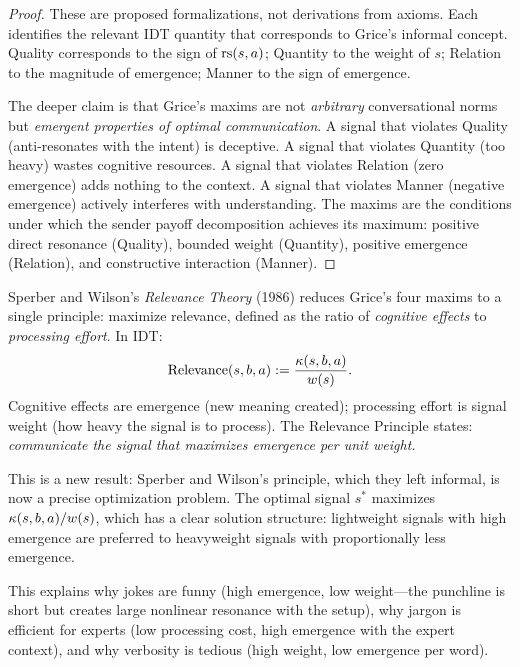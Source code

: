 \begin{proof}
These are proposed formalizations, not derivations from axioms. Each identifies
the relevant IDT quantity that corresponds to Grice's informal concept.
Quality corresponds to the sign of $\mathrm{rs}(s,a)$; Quantity to the weight of $s$;
Relation to the magnitude of emergence; Manner to the sign of emergence.

The deeper claim is that Grice's maxims are not \emph{arbitrary} conversational
norms but \emph{emergent properties of optimal communication}. A signal that
violates Quality (anti-resonates with the intent) is deceptive. A signal
that violates Quantity (too heavy) wastes cognitive resources. A signal
that violates Relation (zero emergence) adds nothing to the context.
A signal that violates Manner (negative emergence) actively interferes
with understanding. The maxims are the conditions under which the
sender payoff decomposition achieves its maximum: positive direct
resonance (Quality), bounded weight (Quantity), positive emergence
(Relation), and constructive interaction (Manner).
\end{proof}

\begin{interpretation}
Sperber and Wilson's \emph{Relevance Theory} (1986) reduces Grice's
four maxims to a single principle: maximize relevance, defined as the
ratio of \emph{cognitive effects} to \emph{processing effort}. In IDT:
\[
\text{Relevance}(s, b, a) := \frac{\kappa(s, b, a)}{w(s)}.
\]
Cognitive effects are emergence (new meaning created); processing effort
is signal weight (how heavy the signal is to process). The Relevance
Principle states: \emph{communicate the signal that maximizes emergence
per unit weight.}

This is a new result: Sperber and Wilson's principle, which they left
informal, is now a precise optimization problem. The optimal signal
$s^*$ maximizes $\kappa(s, b, a) / w(s)$, which has a clear solution
structure: lightweight signals with high emergence are preferred to
heavyweight signals with proportionally less emergence.

This explains why jokes are funny (high emergence, low weight---the
punchline is short but creates large nonlinear resonance with the
setup), why jargon is efficient for experts (low processing cost,
high emergence with the expert context), and why verbosity is
tedious (high weight, low emergence per word).
\end{interpretation}

